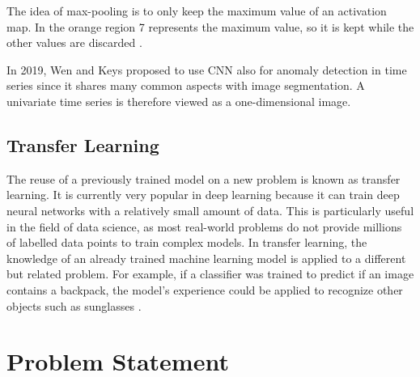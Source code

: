 The idea of max-pooling is to only keep the maximum value of an activation map. In the orange region 7 represents the maximum value, so it is kept while the other values are discarded \parencite{RichStureborg2019}.

In 2019, Wen and Keys proposed to use CNN also for anomaly detection in time series since it shares many common aspects with image segmentation. A univariate time series is therefore viewed as a one-dimensional image.\\ 




\subsection{Transfer Learning}
The reuse of a previously trained model on a new problem is known as transfer learning. It is currently very popular in deep learning because it can train deep neural networks with a relatively small amount of data. This is particularly useful in the field of data science, as most real-world problems do not provide millions of labelled data points to train complex models.
In transfer learning, the knowledge of an already trained machine learning model is applied to a different but related problem. For example, if a classifier was trained to predict if an image contains a backpack, the model's experience could be applied to recognize other objects such as sunglasses \parencite{NiklasDonges2020}.

\section{Problem Statement} \label{Problem}

